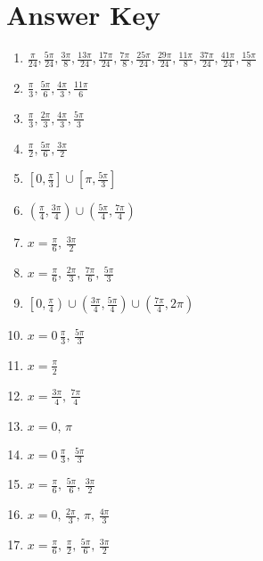 \newpage

\section{Answer Key}

\begin{enumerate}
	\item $\frac{\pi}{24}, \frac{5\pi}{24}, \frac{3\pi}{8}, \frac{13\pi}{24}, \frac{17\pi}{24}, \frac{7\pi}{8}, \frac{25\pi}{24}, \frac{29\pi}{24}, \frac{11\pi}{8}, \frac{37\pi}{24}, \frac{41\pi}{24}, \frac{15\pi}{8}$
    
	\item $\frac{\pi}{3}, \frac{5\pi}{6}, \frac{4\pi}{3}, \frac{11\pi}{6}$
    
	\item $\frac{\pi}{3}, \frac{2\pi}{3}, \frac{4\pi}{3}, \frac{5\pi}{3}$
    
	\item $\frac{\pi}{2}, \frac{5\pi}{6}, \frac{3\pi}{2}$
    
	\item $\left[0, \frac{\pi}{3}\right] \cup \left[\pi, \frac{5\pi}{3}\right]$
    
	\item $\left(\frac{\pi}{4}, \frac{3\pi}{4}\right) \cup \left(\frac{5\pi}{4}, \frac{7\pi}{4}\right)$
	
	\item $x = \frac{\pi}{6}, \, \frac{3\pi}{2}$
	
	\item $x = \frac{\pi}{6}, \, \frac{2\pi}{3}, \, \frac{7\pi}{6}, \, \frac{5\pi}{3}$
	
    \item $\left[0, \frac{\pi}{4}\right) \cup \left(\frac{3\pi}{4}, \frac{5\pi}{4}\right) \cup \left(\frac{7\pi}{4}, 2\pi\right)$
    
    \item $x = 0 \, \frac{\pi}{3}, \, \frac{5\pi}{3}$
    
    \item $x = \frac{\pi}{2}$
    
    \item $x = \frac{3\pi}{4}, \, \frac{7\pi}{4}$
    \item $x = 0, \, \pi$
    \item $x = 0 \, \frac{\pi}{3}, \, \frac{5\pi}{3}$
    \item $x = \frac{\pi}{6}, \, \frac{5\pi}{6}, \, \frac{3\pi}{2}$
    \item $x = 0, \, \frac{2\pi}{3}, \, \pi, \, \frac{4\pi}{3}$
    \item $x = \frac{\pi}{6}, \, \frac{\pi}{2}, \, \frac{5\pi}{6}, \, \frac{3\pi}{2}$
    

\end{enumerate}
